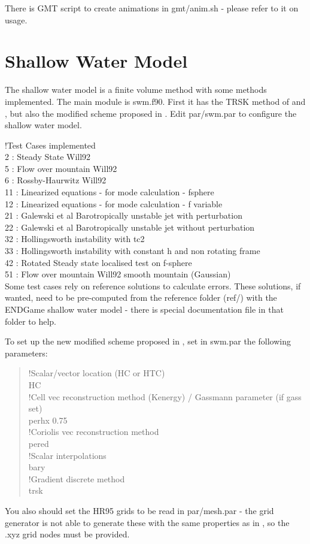 \documentclass[a4paper,10pt]{article}
\begin{document}
There is GMT script to create animations in gmt/anim.sh - please refer to it on usage.

\section{Shallow Water Model}

The shallow water model is a finite volume method with some methods implemented. The main module is swm.f90. First it has the TRSK method of \cite{Thuburn2009} and \cite{Ringler2010}, but also the modified scheme proposed in \cite{Peixoto2015}. Edit par/swm.par to configure the shallow water model. 

!Test Cases implemented\\
2 : Steady State Will92\\
5 : Flow over mountain Will92\\
6 : Rossby-Haurwitz Will92 \\
11 : Linearized equations - for mode calculation - fsphere\\
12 : Linearized equations - for mode calculation - f variable\\
21 : Galewski et al Barotropically unstable jet with perturbation\\
22 : Galewski et al Barotropically unstable jet without perturbation\\
32 : Hollingsworth instability with tc2\\
33 : Hollingsworth instability with constant h and non rotating frame  \\
42 : Rotated Steady state localised test on f-sphere\\
51 : Flow over mountain Will92 smooth mountain (Gaussian)\\

Some test cases rely on reference solutions to calculate errors. These solutions, if wanted, need to be pre-computed from the reference folder (ref/) with the ENDGame shallow water model - there is special documentation file in that folder to help.

To set up the new modified scheme proposed in \cite{Peixoto2015}, set in swm.par the following parameters:
\begin{verse}
!Scalar/vector location (HC or HTC) \\
HC \\
!Cell vec reconstruction method (Kenergy) / Gassmann parameter (if gass set) \\
perhx 0.75 \\
!Coriolis vec reconstruction method \\
pered \\
!Scalar interpolations \\
bary \\
!Gradient discrete method \\
trsk \\
\end{verse}
You also should set the HR95 grids to be read in par/mesh.par - the grid generator is not able to generate these with the same properties as in \cite{Heikes1995a}, so the .xyz grid nodes must be provided.
\end{document}
